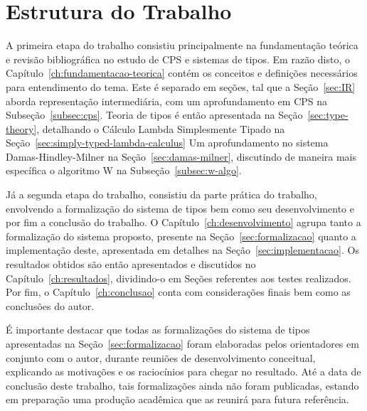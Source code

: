 \section{Estrutura do Trabalho}\label{sec:estrutura-trabalho}

A primeira etapa do trabalho consistiu principalmente na fundamentação teórica e revisão bibliográfica no estudo de CPS e sistemas de tipos.
Em razão disto, o Capítulo~\ref{ch:fundamentacao-teorica} contém os conceitos e definições necessários para entendimento do tema.
Este é separado em seções, tal que a Seção~\ref{sec:IR} aborda representação intermediária, com um aprofundamento em CPS na Subseção~\ref{subsec:cps}.
Teoria de tipos é então apresentada na Seção~\ref{sec:type-theory}, detalhando o Cálculo Lambda Simplesmente Tipado na Seção~\ref{sec:simply-typed-lambda-calculus}
Um aprofundamento no sistema Damas-Hindley-Milner na Seção~\ref{sec:damas-milner}, discutindo de maneira mais específica o algoritmo W na Subseção~\ref{subsec:w-algo}.

Já a segunda etapa do trabalho, consistiu da parte prática do trabalho, envolvendo a formalização do sistema de tipos bem como seu desenvolvimento e por fim a conclusão do trabalho.
O Capítulo~\ref{ch:desenvolvimento} agrupa tanto a formalização do sistema proposto, presente na Seção~\ref{sec:formalizacao} quanto a implementação deste, apresentada em detalhes na Seção~\ref{sec:implementacao}.
Os resultados obtidos são então apresentados e discutidos no Capítulo~\ref{ch:resultados}, dividindo-o em Seções referentes aos testes realizados.
Por fim, o Capítulo~\ref{ch:conclusao} conta com considerações finais bem como as conclusões do autor.

É importante destacar que todas as formalizações do sistema de tipos apresentadas na Seção~\ref{sec:formalizacao} foram elaboradas pelos orientadores em conjunto com o autor, durante reuniões de desenvolvimento conceitual, explicando as motivações e os raciocínios para chegar no resultado.
Até a data de conclusão deste trabalho, tais formalizações ainda não foram publicadas, estando em preparação uma produção acadêmica que as reunirá para futura referência.
